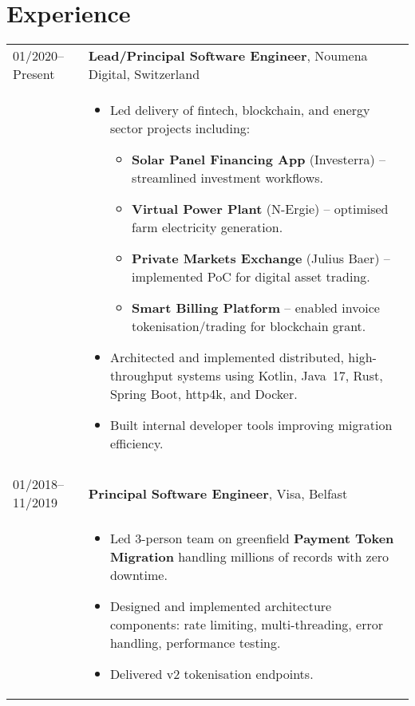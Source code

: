 \documentclass[2pt,a4paper]{article}
\newlength{\datecolumn}
\newlength{\textcolumn}
\begin{document}
\section*{Experience}
\begin{longtable}{p{\datecolumn} p{\textcolumn}}
01/2020--Present & \textbf{Lead/Principal Software Engineer}, Noumena Digital, Switzerland \\
                 & \begin{itemize}
                        \item Led delivery of fintech, blockchain, and energy sector projects including:
                        \begin{itemize}
                            \item \textbf{Solar Panel Financing App} (Investerra) – streamlined investment workflows.
                            \item \textbf{Virtual Power Plant} (N-Ergie) – optimised farm electricity generation.
                            \item \textbf{Private Markets Exchange} (Julius Baer) – implemented PoC for digital asset trading.
                            \item \textbf{Smart Billing Platform} – enabled invoice tokenisation/trading for blockchain grant.
                        \end{itemize} 
                        \item Architected and implemented distributed, high-throughput systems using Kotlin, Java~17, Rust, Spring Boot, http4k, and Docker.
                        \item Built internal developer tools improving migration efficiency.
                   \end{itemize} \\ \\
01/2018--11/2019 & \textbf{Principal Software Engineer}, Visa, Belfast \\
                 & \begin{itemize}
                        \item Led 3-person team on greenfield \textbf{Payment Token Migration} handling millions of records with zero downtime.
                        \item Designed and implemented architecture components: rate limiting, multi-threading, error handling, performance testing.
                        \item Delivered v2 tokenisation endpoints.

\end{itemize}
\end{longtable}
\end{document}
